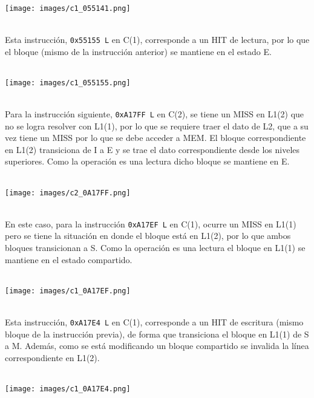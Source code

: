 \documentclass {article}
\begin{document}
\\
\begin{centering} \texttt{[image: images/c1\_055141.png]} \end{centering}
\\
Esta instrucción, \texttt{0x55155 L} en C(1), corresponde a un HIT de lectura, por lo que el bloque
(mismo de la instrucción anterior) se mantiene en el estado E.
\\
\\
\begin{centering} \texttt{[image: images/c1\_055155.png]} \end{centering}
\\
Para la instrucción siguiente, \texttt{0xA17FF L} en C(2), se tiene un MISS en L1(2) que no se logra
resolver con L1(1), por lo que se requiere traer el dato de L2, que a su vez tiene un MISS por lo
que se debe acceder a MEM. El bloque correspondiente en L1(2) transiciona de I a E y se trae el dato
correspondiente desde los niveles superiores. Como la operación es una lectura dicho bloque se
mantiene en E.
\\
\\
\begin{centering} \texttt{[image: images/c2\_0A17FF.png]} \end{centering}
\\
En este caso, para la instrucción \texttt{0xA17EF L} en C(1), ocurre un MISS en L1(1) pero se tiene
la situación en donde el bloque está en L1(2), por lo que ambos bloques transicionan a S. Como la
operación es una lectura el bloque en L1(1) se mantiene en el estado compartido.
\\
\\
\begin{centering} \texttt{[image: images/c1\_0A17EF.png]} \end{centering}
\\
Esta instrucción, \texttt{0xA17E4 L} en C(1), corresponde a un HIT de escritura (mismo bloque de la
instrucción previa), de forma que transiciona el bloque en L1(1) de S a M. Además, como se está
modificando un bloque compartido se invalida la línea correspondiente en L1(2).
\\
\\
\begin{centering} \texttt{[image: images/c1\_0A17E4.png]} \end{centering}
\\
\end{document}
